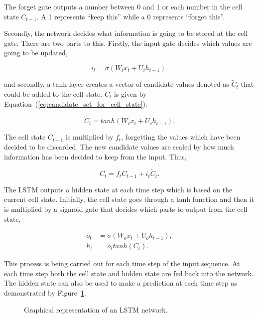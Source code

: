 The forget gate outputs a number between 0 and 1 or each number in the cell
state \(C_{t-1}\). A 1 represents ``keep this'' while a 0 represents ``forget
this''.

Secondly, the network decides what information is going to be stored at the
cell gate. There are two parts to this. Firstly, the input gate decides which values
are going to be updated,

\begin{equation}\label{eq:input_gate}
    i_{t} = \sigma(W_{i}x_{t} + U_{i}h_{t-1}).
\end{equation}

and secondly, a tanh layer creates a vector of candidate values denoted as
\(\tilde{C}_{t}\) that could be added to the cell state. \(\tilde{C}_{t}\) 
is given by Equation~(\ref{eq:candidate_set_for_cell_state}).

\begin{equation}\label{eq:candidate_set_for_cell_state}
    \tilde{C}_{t} = tanh(W_{c}x_{t} + U_{c}h_{t-1}).
\end{equation}

The cell state \(C_{t-1}\) is multiplied by \(f_{t}\), forgetting the values
which have been decided to be discarded. The new candidate values are scaled by how
much information has been decided to keep from the input. Thus,

\begin{equation}\label{eq:cell_gate}
    C_{t} = f_{t} C_{t-1} + i_{t} \tilde{C}_{t}.
\end{equation}

The LSTM outputs a hidden state at each time step which is based on the current
cell state. Initially, the cell state goes through a tanh function and then it
is multiplied by a sigmoid gate that decides which parts to output from the cell
state,

\begin{align}\label{eq:outpu_gate}
    o_{t} & = \sigma(W_{o}x_{t} + U_{o}h_{t-1}), \\
    h_{t} & = o_{t} tanh(C_{t}).
\end{align}

This process is being carried out for each time step of the input sequence. At
each time step both the cell state and hidden state are fed back into the
network. The hidden state can also be used to make a prediction at each time
step as demonstrated by Figure~\ref{fig:lstm}.

\vspace{1cm}
\begin{figure}[!htbp]
    \centering
    
    \caption{Graphical representation of an LSTM network.}\label{fig:lstm}
\end{figure}

